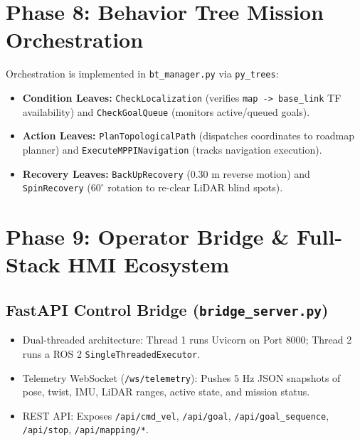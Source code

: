 \documentclass[10pt,a4paper]{article}
\begin{document}
\section{Phase 8: Behavior Tree Mission Orchestration}

Orchestration is implemented in \texttt{bt_manager.py} via \texttt{py\_trees}:
\begin{itemize}
    \item \textbf{Condition Leaves:} \texttt{CheckLocalization} (verifies \texttt{map -> base\_link} TF availability) and \texttt{CheckGoalQueue} (monitors active/queued goals).
    \item \textbf{Action Leaves:} \texttt{PlanTopologicalPath} (dispatches coordinates to roadmap planner) and \texttt{ExecuteMPPINavigation} (tracks navigation execution).
    \item \textbf{Recovery Leaves:} \texttt{BackUpRecovery} ($0.30\text{ m}$ reverse motion) and \texttt{SpinRecovery} ($60^\circ$ rotation to re-clear LiDAR blind spots).
\end{itemize}

\section{Phase 9: Operator Bridge \& Full-Stack HMI Ecosystem}

\subsection{FastAPI Control Bridge (\texttt{bridge_server.py})}
\begin{itemize}
    \item Dual-threaded architecture: Thread 1 runs Uvicorn on Port $8000$; Thread 2 runs a ROS 2 \texttt{SingleThreadedExecutor}.
    \item Telemetry WebSocket (\texttt{/ws/telemetry}): Pushes $5\text{ Hz}$ JSON snapshots of pose, twist, IMU, LiDAR ranges, active state, and mission status.
    \item REST API: Exposes \texttt{/api/cmd\_vel}, \texttt{/api/goal}, \texttt{/api/goal\_sequence}, \texttt{/api/stop}, \texttt{/api/mapping/*}.
\end{itemize}
\end{document}
